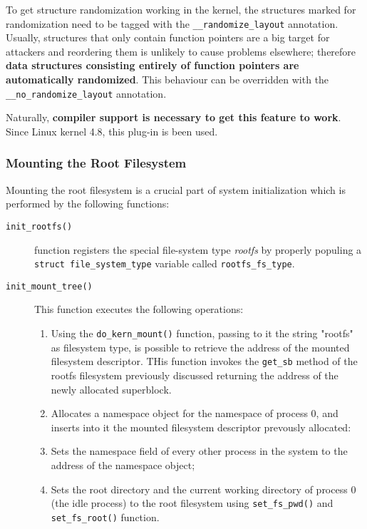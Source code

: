\documentclass[10pt,a4paper]{article}
\begin{document}
To get structure randomization working in the kernel, the structures marked for randomization need to be tagged with the \texttt{\_\_randomize\_layout} annotation. Usually, structures that only contain function pointers are a big target for attackers and reordering them is unlikely to cause problems elsewhere; therefore \textbf{data structures consisting entirely of function pointers are automatically randomized}. This behaviour can be overridden with the \texttt{\_\_no\_randomize\_layout} annotation. 

Naturally, \textbf{compiler support is necessary to get this feature to work}. Since Linux kernel 4.8, this plug-in is been used.


\subsubsection{Mounting the Root Filesystem}

Mounting the root filesystem is a crucial part of system initialization which is performed by the following functions:

\begin{description}
\item[\texttt{init\_rootfs()}] function registers the special file-system type \textit{rootfs} by properly populing a \texttt{struct file\_system\_type} variable called \texttt{rootfs\_fs\_type}.
\item[\texttt{init\_mount\_tree()}] This function executes the following operations:

\begin{enumerate}

\item Using the \texttt{do\_kern\_mount()} function, passing to it the string "rootfs" as filesystem type, is possible to retrieve the address of the mounted filesystem descriptor. THis function invokes the \texttt{get\_sb} method of the rootfs filesystem previously discussed returning the address of the newly allocated superblock.

\item Allocates a namespace object for the namespace of process 0, and inserts into it the mounted filesystem descriptor prevously allocated:

\item Sets the namespace field of every other process in the system to the address of the namespace object;



\item Sets the root directory and the current working directory of process $0$ (the idle process) to the root filesystem using \texttt{set\_fs\_pwd()} and \texttt{set\_fs\_root()} function.


\end{enumerate}
\end{description}
\end{document}
